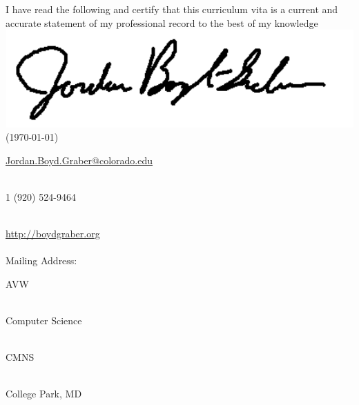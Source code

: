 

\ifumd
\usepackage{graphicx}
\fi

\newcommand{\umdtext}[2]{
\ifumd
#1 #2
\else
#2
\fi
}








\ifumd
\vspace{.2cm}
  \parbox{\linewidth}{I have read the following and certify that this
  curriculum vita is a current and accurate statement of my
  professional record to the best of my
  knowledge \flushright  \includegraphics[width=.2\linewidth]{resume_src/signature} \\
\flushright  (\today{})}
\vspace{.5cm}
\fi

\ifumd


\fi

\noindent\href{mailto:Jordan.Boyd.Graber@colorado.edu}{Jordan.Boyd.Graber@colorado.edu}
\umdtext{\\}{\bull} %
\textsmaller{+}1 (920) 524-9464
\umdtext{\\}{\bull} \href{http://boydgraber.org}{\url{http://boydgraber.org}}\\ %
\umdtext{\\Mailing Address: \\ \bull}{} 3155 AVW
\umdtext{\\ }{\bull} Computer Science
\umdtext{\\ }{\bull} CMNS
\umdtext{\\ }{\bull} College Park, MD 

\ifumd
\else
\spacedhrule{0.9em}{-0.4em} %
\fi

